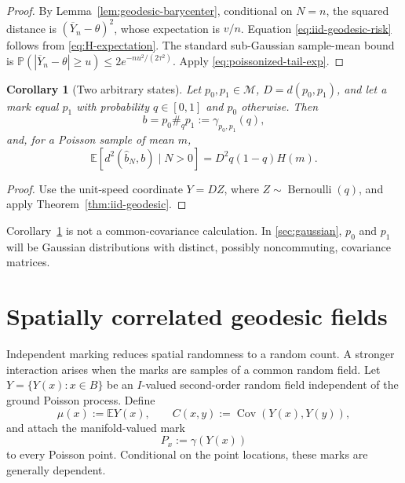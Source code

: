 \documentclass[11pt,a4paper]{article}
\newtheorem{corollary}[theorem]{Corollary}
\theoremstyle{remark}
\newcommand{\M}{\mathcal M}
\newcommand{\EE}{\mathbb E}
\newcommand{\PP}{\mathbb P}
\begin{document}
\begin{proof}
By Lemma~\ref{lem:geodesic-barycenter}, conditional on \(N=n\), the squared distance is \((\overline Y_n-\theta)^2\), whose expectation is \(v/n\).  Equation \eqref{eq:iid-geodesic-risk} follows from \eqref{eq:H-expectation}.  The standard sub-Gaussian sample-mean bound is
\(\PP(|\overline Y_n-\theta|\ge u)\le2e^{-nu^2/(2\tau^2)}\).  Apply \eqref{eq:poissonized-tail-exp}.
\end{proof}

\begin{corollary}[Two arbitrary states]
\label{cor:two-state}
Let \(p_0,p_1\in\M\), \(D=d(p_0,p_1)\), and let a mark equal \(p_1\) with probability \(q\in[0,1]\) and \(p_0\) otherwise.  Then
\begin{equation}
\label{eq:two-state-bary}
 b=p_0\#_q p_1:=\gamma_{p_0,p_1}(q),
\end{equation}
and, for a Poisson sample of mean \(m\),
\begin{equation}
\label{eq:two-state-risk}
 \EE[d^2(\widehat b_N,b)\mid N>0]
 =D^2q(1-q)H(m).
\end{equation}
\end{corollary}

\begin{proof}
Use the unit-speed coordinate \(Y=DZ\), where \(Z\sim\operatorname{Bernoulli}(q)\), and apply Theorem~\ref{thm:iid-geodesic}.
\end{proof}

Corollary~\ref{cor:two-state} is not a common-covariance calculation.  In \cref{sec:gaussian}, \(p_0\) and \(p_1\) will be Gaussian distributions with distinct, possibly noncommuting, covariance matrices.

\section{Spatially correlated geodesic fields}
\label{sec:correlated}

Independent marking reduces spatial randomness to a random count.  A stronger interaction arises when the marks are samples of a common random field.  Let \(Y=\{Y(x):x\in B\}\) be an \(I\)-valued second-order random field independent of the ground Poisson process.  Define
\begin{equation}
\label{eq:field-mean-cov}
 \mu(x):=\EE Y(x),
 \qquad
 C(x,y):=\operatorname{Cov}(Y(x),Y(y)),
\end{equation}
and attach the manifold-valued mark
\begin{equation}
\label{eq:geodesic-field-mark}
 P_x:=\gamma(Y(x))
\end{equation}
to every Poisson point.  Conditional on the point locations, these marks are generally dependent.
\end{document}
